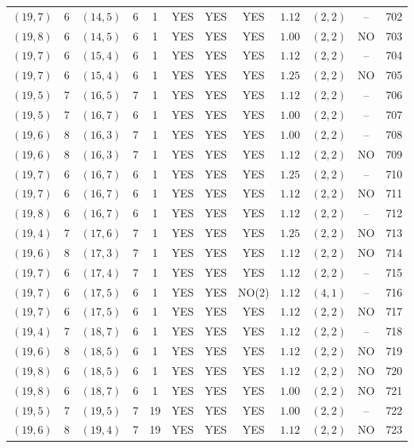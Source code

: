 \begin{longtable}{|c|c|c|c|c|c|c|c|c|c|c|c|}
$(19,7)$ & 6 & $(14,5)$ & 6 & 1 & YES & YES & YES & $1.12$ & $(2,2)$ & -- & 702\\
$(19,8)$ & 6 & $(14,5)$ & 6 & 1 & YES & YES & YES & $1.00$ & $(2,2)$ & NO & 703\\
$(19,7)$ & 6 & $(15,4)$ & 6 & 1 & YES & YES & YES & $1.12$ & $(2,2)$ & -- & 704\\
$(19,7)$ & 6 & $(15,4)$ & 6 & 1 & YES & YES & YES & $1.25$ & $(2,2)$ & NO & 705\\
$(19,5)$ & 7 & $(16,5)$ & 7 & 1 & YES & YES & YES & $1.12$ & $(2,2)$ & -- & 706\\
$(19,5)$ & 7 & $(16,7)$ & 6 & 1 & YES & YES & YES & $1.00$ & $(2,2)$ & -- & 707\\
$(19,6)$ & 8 & $(16,3)$ & 7 & 1 & YES & YES & YES & $1.00$ & $(2,2)$ & -- & 708\\
$(19,6)$ & 8 & $(16,3)$ & 7 & 1 & YES & YES & YES & $1.12$ & $(2,2)$ & NO & 709\\
$(19,7)$ & 6 & $(16,7)$ & 6 & 1 & YES & YES & YES & $1.25$ & $(2,2)$ & -- & 710\\
$(19,7)$ & 6 & $(16,7)$ & 6 & 1 & YES & YES & YES & $1.12$ & $(2,2)$ & NO & 711\\
$(19,8)$ & 6 & $(16,7)$ & 6 & 1 & YES & YES & YES & $1.12$ & $(2,2)$ & -- & 712\\
$(19,4)$ & 7 & $(17,6)$ & 7 & 1 & YES & YES & YES & $1.25$ & $(2,2)$ & NO & 713\\
$(19,6)$ & 8 & $(17,3)$ & 7 & 1 & YES & YES & YES & $1.12$ & $(2,2)$ & NO & 714\\
$(19,7)$ & 6 & $(17,4)$ & 7 & 1 & YES & YES & YES & $1.12$ & $(2,2)$ & -- & 715\\
$(19,7)$ & 6 & $(17,5)$ & 6 & 1 & YES & YES & NO(2) & $1.12$ & $(4,1)$ & -- & 716\\
$(19,7)$ & 6 & $(17,5)$ & 6 & 1 & YES & YES & YES & $1.12$ & $(2,2)$ & NO & 717\\
$(19,4)$ & 7 & $(18,7)$ & 6 & 1 & YES & YES & YES & $1.12$ & $(2,2)$ & -- & 718\\
$(19,6)$ & 8 & $(18,5)$ & 6 & 1 & YES & YES & YES & $1.12$ & $(2,2)$ & NO & 719\\
$(19,8)$ & 6 & $(18,5)$ & 6 & 1 & YES & YES & YES & $1.12$ & $(2,2)$ & NO & 720\\
$(19,8)$ & 6 & $(18,7)$ & 6 & 1 & YES & YES & YES & $1.00$ & $(2,2)$ & NO & 721\\
$(19,5)$ & 7 & $(19,5)$ & 7 & 19 & YES & YES & YES & $1.00$ & $(2,2)$ & -- & 722\\
$(19,6)$ & 8 & $(19,4)$ & 7 & 19 & YES & YES & YES & $1.12$ & $(2,2)$ & NO & 723\\

\end{longtable}
